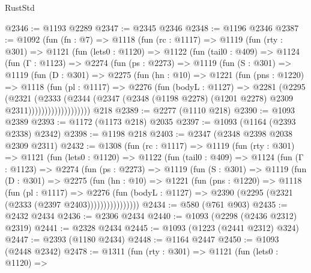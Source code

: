 \begin{lexlean}{RustStd}
\begin{coremodule}
{\begin{coremodule}
{{{{{{{{@2346 := @1193 @2289
@2347 := @2345 @2346
@2348 := @1196 @2346
@2387 := @1092
    (fun (fn : @7) =>
    @1118
      (fun (rc : @1117) =>
      @1119
        (fun (rty : @301) =>
        @1121
          (fun (lets0 : @1120) =>
          @1122
            (fun (tail0 : @409) =>
            @1124
              (fun (Γ : @1123) =>
              @2274
                (fun (ps : @2273) =>
                @1119
                  (fun (S : @301) =>
                  @1119
                    (fun (D : @301) =>
                    @2275
                      (fun (hn : @10) =>
                      @1221
                        (fun (pns : @1220) =>
                        @1118
                          (fun (pl : @1117) =>
                          @2276
                            (fun (bodyL : @1127) =>
                            @2281
                              (@2295
                                (@2321
                                  (@2333
                                    (@2344
                                      (@2347
                                        (@2348
                                          (@1198 @2278)
                                          (@1201 @2278)
                                          @2309
                                          @2311)))))))))))))))))))
    @218
@2389 := @2277 (@1110 @218)
@2390 := @1093 @2389
@2393 := @1172 (@1173 @218) @2035
@2397 := @1093 (@1164 (@2393 @2338) @2342)
@2398 := @1198 @218
@2403 := @2347 (@2348 @2398 @2038 @2309 @2311)
@2432 := @1308
    (fun (rc : @1117) =>
    @1119
      (fun (rty : @301) =>
      @1121
        (fun (lets0 : @1120) =>
        @1122
          (fun (tail0 : @409) =>
          @1124
            (fun (Γ : @1123) =>
            @2274
              (fun (ps : @2273) =>
              @1119
                (fun (S : @301) =>
                @1119
                  (fun (D : @301) =>
                  @2275
                    (fun (hn : @10) =>
                    @1221
                      (fun (pns : @1220) =>
                      @1118
                        (fun (pl : @1117) =>
                        @2276
                          (fun (bodyL : @1127) =>
                          @2390 (@2295 (@2321 (@2333 (@2397 @2403))))))))))))))))
@2434 := @580 (@761 @903)
@2435 := @2432 @2434
@2436 := @2306 @2434
@2440 := @1093 (@2298 (@2436 @2312) @2319)
@2441 := @2328 @2434
@2445 := @1093 (@1223 (@2441 @2312) @324)
@2447 := @2393 (@1180 @2434)
@2448 := @1164 @2447
@2450 := @1093 (@2448 @2342)
@2478 := @1311
    (fun (rty : @301) =>
    @1121
      (fun (lets0 : @1120) =>
}}}}}}}}
\end{coremodule}}
\end{coremodule}
\end{lexlean}
